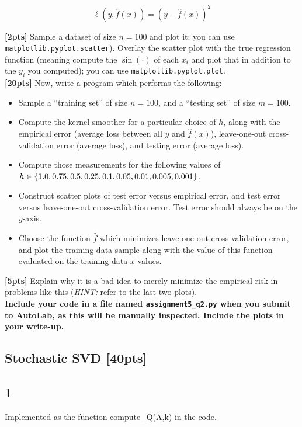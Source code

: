 \documentclass[paper=a4, fontsize=11pt]{scrartcl} %
\numberwithin{figure}{section} %
\numberwithin{table}{section} %
\begin{document}
$$
\ell(y, \hat{f}(x)) = (y - \hat{f}(x))^2
$$

\textbf{[2pts]} Sample a dataset of size $n = 100$ and plot it; you can use \texttt{matplotlib.pyplot.scatter}). Overlay the scatter plot with the true regression function (meaning compute the $\sin(\cdot)$ of each $x_i$ and plot that in addition to the $y_i$ you computed); you can use \texttt{matplotlib.pyplot.plot}. \\

\textbf{[20pts]} Now, write a program which performs the following:
\begin{itemize}
	\item Sample a ``training set'' of size $n = 100$, and a ``testing set'' of size $m = 100$.
	\item Compute the kernel smoother for a particular choice of $h$, along with the empirical error (average loss between all $y$ and $\hat{f}(x)$), leave-one-out cross-validation error (average loss), and testing error (average loss).
	\item Compute those measurements for the following values of $h \in \\ \{1.0, 0.75, 0.5, 0.25, 0.1, 0.05, 0.01, 0.005, 0.001 \}$.
	\item Construct scatter plots of test error versus empirical error, and test error versus leave-one-out cross-validation error. Test error should always be on the $y$-axis.
	\item Choose the function $\hat{f}$ which minimizes leave-one-out cross-validation error, and plot the training data sample along with the value of this function evaluated on the training data $x$ values.
\end{itemize}

\textbf{[5pts]} Explain why it is a bad idea to merely minimize the empirical risk in problems like this (\emph{HINT:} refer to the last two plots). \\

\textbf{Include your code in a file named \texttt{assignment5\_q2.py} when you submit to AutoLab, as this will be manually inspected. Include the plots in your write-up.}

\subsection{Stochastic SVD \textbf{[40pts]}}

\subsection*{1}
 Implemented as the function compute\_Q(A,k) in the code.\\
\end{document}

